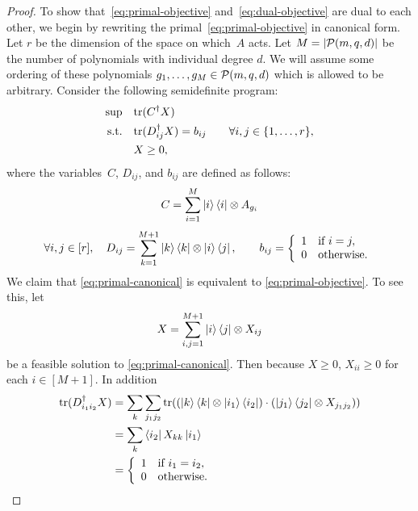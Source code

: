 \begin{proof}
To show that~\eqref{eq:primal-objective} and~\eqref{eq:dual-objective} are dual to each other,
we begin by rewriting the primal~\eqref{eq:primal-objective} in canonical form.
Let $r$ be the dimension of the space on which~$A$ acts.
Let $M = |\mathcal{P}(m, q, d)|$ be the number of polynomials with individual degree $d$. 
We will assume some ordering of these polynomials $g_1, \ldots, g_M \in \mathcal{P}(m, q, d)$ which is allowed to be arbitrary.
Consider the following semidefinite program:
\begin{align}
\sup &\quad \mathrm{tr}(C^\dagger X) \label{eq:primal-canonical}\\
  \text{s.t.} &\quad   \mathrm{tr}(D_{ij}^\dagger X) = b_{ij} \qquad\forall i,j\in\{1,\ldots,r\},\nonumber\\
	&\quad X \geq 0,\nonumber
\end{align}
where the variables~$C$, $D_{ij}$, and $b_{ij}$ are defined as follows:
\begin{equation*}
C = \sum_{i = 1}^M \ket{i}\bra{i} \otimes A_{g_i}
\end{equation*}
\begin{equation*}
\forall i,j \in [r], \quad
D_{ij} = \sum_{k=1}^{M+1} \ket{k}\bra{k} \otimes \ket{i}\bra{j},
\qquad
b_{ij}  = \left\{\begin{array}{rl}
		1 & \text{if } i = j,\\
		0 & \text{otherwise}.
		\end{array}\right.
\end{equation*}
We claim that \eqref{eq:primal-canonical} is equivalent to \eqref{eq:primal-objective}.
To see this, let
\begin{equation*}
X = \sum_{i, j =1}^{M+1} \ket{i}\bra{j} \otimes X_{ij}
\end{equation*}
be a feasible solution to \eqref{eq:primal-canonical}.
Then because $X \geq 0$, $X_{i i} \geq 0$ for each $i \in [M+1]$. In addition
\begin{align*}
\mathrm{tr}(D_{i_1 i_2}^\dagger X)
&= \sum_k \sum_{j_1 j_2} \mathrm{tr}((\ket{k}\bra{k} \otimes \ket{i_1}\bra{i_2})\cdot(\ket{j_1} \bra{j_2} \otimes X_{j_1 j_2}))\\
&= \sum_k  \bra{i_2} X_{k k} \ket{i_1}\\
&= \left\{\begin{array}{rl}
		1 & \text{if } i_1 = i_2,\\
		0 & \text{otherwise}.
		\end{array}\right.
\end{align*}

\end{proof}
